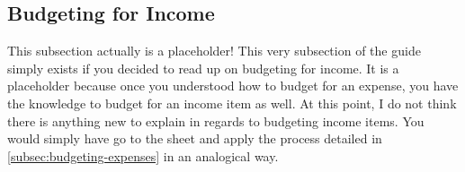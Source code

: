 \subsection{Budgeting for Income}
\label{subsec:budgeting-income}

This subsection actually is a placeholder!
This very subsection of the guide simply exists if you decided to read up on budgeting for income.
It is a placeholder because once you understood how to budget for an expense, you have the knowledge to budget for an income item as well.
At this point, I do not think there is anything new to explain in regards to budgeting income items.
You would simply have go to the sheet  and apply the process detailed in \autoref{subsec:budgeting-expenses} in an analogical way.

